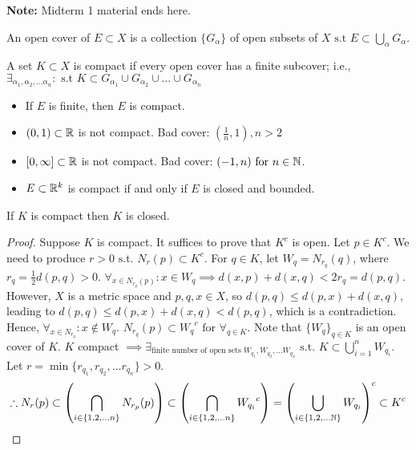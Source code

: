 \textbf{Note:} Midterm 1 material ends here.


\begin{definition}
	An open cover of $E \subset X$ is a collection $\{G_{\alpha}\}$ of open subsets of $X \text{ s.t } E \subset \bigcup_{\alpha} G_{\alpha}$.
\end{definition}

\begin{definition}[Compact]
	A set $K \subset X$ is compact if every open cover has a finite subcover; i.e., $\exists_{\alpha_1,\alpha_2, \ldots \alpha_n}: \text{ s.t } K \subset G_{\alpha_1} \cup G_{\alpha_2} \cup \ldots  \cup G_{\alpha_n}$
\end{definition}
\begin{example}\hfill
	\begin{itemize}
		\item If $E$ is finite, then $E$ is compact.
		\item $(0,1) \subset \mathbb{R} $ is not compact. Bad cover: $(\frac{1}{n},1), n>2$
		\item $[0, \infty ] \subset \mathbb{R} $ is not compact. Bad cover: $(-1,n) \text{ for } n \in \mathbb{N}$.
		\item $E \subset \mathbb{R}^{k}$ is compact if and only if $E$ is closed and bounded.
	\end{itemize}
\end{example}
\begin{thm}[34]
	If $K$ is compact then $K$ is closed.
	\begin{proof}
		Suppose $K$ is compact. It suffices to prove that $K^{c}$ is open. Let $ p \in K ^{c}$. We need to produce $r>0 \text{ s.t. } N_r(p) \subset K^{c}$.
		For $q \in K$, let $W_q=N_{r_q}(q)$, where $r_q=\frac{1}{2}d(p,q)>0$.
		$\forall_{x \in N_{r_q}\left(p\right)}: x \in W_q \implies d(x,p)+d(x,q)<2r_q=d(p,q)$. However, $X$ is a metric space and $p,q,x \in X$, so $d(p,q) \le d(p,x)+d(x,q)$, leading to $d(p,q)\le d(p,x)+d(x,q)<d(p,q)$, which is a contradiction.
		Hence, $\forall_{x \in N_{r_q}}: x \not\in W_q$.
		$N_{r_{q}}(p) \subset {W_q}^{c} \text{ for } \forall_{q \in K}$.
		Note that $\{W_q\}_{q \in K} $ is an open cover of $K$.
		$K$ compact $\implies \exists_{\text{finite number of open sets } W_{q_1},W_{q_2}, \ldots W_{q_n}} \text{ s.t. }  K \subset \bigcup_{i=1}^{n}{W_{q_i}}$. Let $r= \min\{r_{q_1},r_{q_2}, \ldots r_{q_n}\}>0$.
		\[
			\therefore {N_r}(p) \subset  \left(\bigcap_{i \in \{1,2, \ldots n\} } N_{r_p}(p)\right)  \subset  \left(\bigcap_{i \in  \{1,2,\ldots n\}} {W_{q_i}}^{c}\right)=\left(\bigcup_{i \in \{1,2,\ldots \mathbb{N} \}}W_{q_i}\right)^{c} \subset K^{c}
		\]
	\end{proof}
\end{thm}
